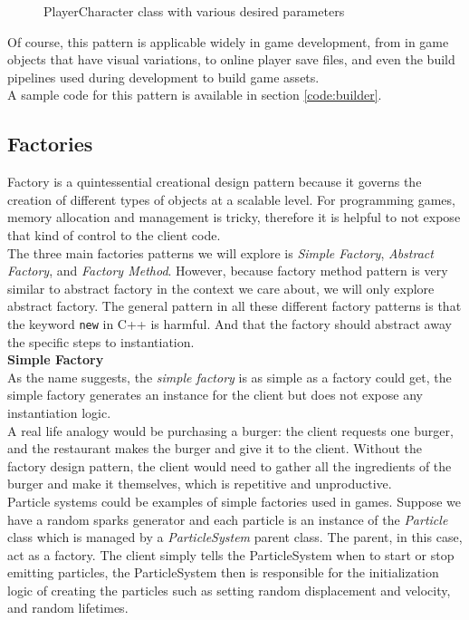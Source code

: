 \begin{multicols}{2}
\begin{figure}[H]
	\caption{PlayerCharacter class with various desired parameters}
	\label{fig:playercharacter-2}
\end{figure}

Of course, this pattern is applicable widely in game development, from in game objects that have visual variations, to online player save files, and even the build pipelines used during development to build game assets.\bs
\\
A sample code for this pattern is available in section \ref{code:builder}.

\subsection{Factories}

Factory is a quintessential creational design pattern because it governs the creation of different types of objects at a scalable level. For programming games, memory allocation and management is tricky, therefore it is helpful to not expose that kind of control to the client code.\bs
\\
The three main factories patterns we will explore is \textit{Simple Factory}, \textit{Abstract Factory}, and \textit{Factory Method}. However, because factory method pattern is very similar to abstract factory\cite{sm-factory-method} in the context we care about, we will only explore abstract factory. The general pattern in all these different factory patterns is that the keyword \texttt{new} in C++ is harmful. And that the factory should abstract away the specific steps to instantiation.\bs
\\
\textbf{Simple Factory}\\
As the name suggests, the \textit{simple factory} is as simple as a factory could get, the simple factory generates an instance for the client but does not expose any instantiation logic.\cite{simple-factory}\bs
\\
A real life analogy would be purchasing a burger: the client requests one burger, and the restaurant makes the burger and give it to the client. Without the factory design pattern, the client would need to gather all the ingredients of the burger and make it themselves, which is repetitive and unproductive.\bs
\\
Particle systems could be examples of simple factories used in games. Suppose we have a random sparks generator and each particle is an instance of the \textit{Particle} class which is managed by a \textit{ParticleSystem} parent class. The parent, in this case, act as a factory. The client simply tells the ParticleSystem when to start or stop emitting particles, the ParticleSystem then is responsible for the initialization logic of creating the particles such as setting random displacement and velocity, and random lifetimes.\bs

\end{multicols}
